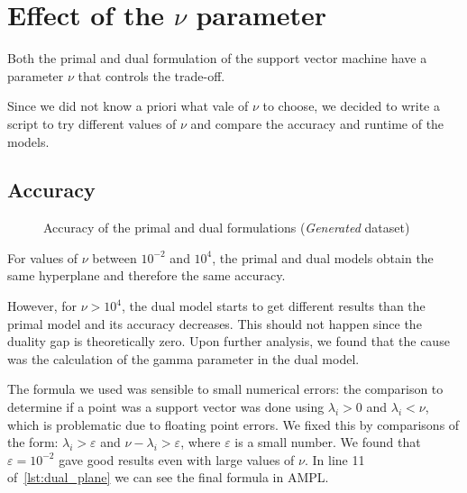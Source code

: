 \chapter{Effect of the $\nu$ parameter}

Both the primal and dual formulation of the support vector machine
have a parameter $\nu$ that controls the trade-off.

Since we did not know a priori what vale of $\nu$ to choose,
we decided to write a script to try different values of $\nu$ and
compare the accuracy and runtime of the models.

\section{Accuracy}
\label{sec:nu-accuracy}

\begin{figure}[H]
    \caption{Accuracy of the primal and dual formulations (\emph{Generated} dataset)}
\end{figure}

For values of $\nu$ between $10^{-2}$ and $10^{4}$, the primal
and dual models obtain the same hyperplane and therefore the same accuracy.

However, for $\nu > 10^{4}$, the dual model starts to get different
results than the primal model and its accuracy decreases. This should
not happen since the duality gap is theoretically zero. Upon further
analysis, we found that the cause was the calculation of
the gamma parameter in the dual model.

The formula we used was
sensible to small numerical errors: the comparison
to determine if a point was a support vector was done using
$\lambda_i > 0$ and $\lambda_i < \nu$, which is problematic
due to floating point errors. We fixed this by comparisons
of the form: $\lambda_i > \varepsilon$ and $\nu - \lambda_i > \varepsilon$,
where $\varepsilon$ is a small number. We found that $\varepsilon = 10^{-2}$
gave good results even with large values of $\nu$.
In line 11 of~\cref{lst:dual_plane} we can see the final formula in AMPL.

